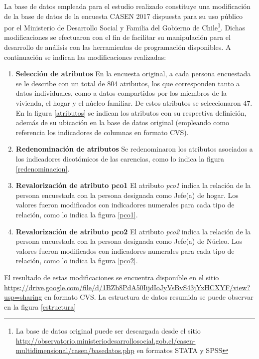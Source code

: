 \documentclass[12pt,letterpaper,spanish]{article}
\begin{document}
La base de datos empleada para el estudio realizado constituye una modificación de la base de datos de la encuesta CASEN 2017 dispuesta para su uso público por el Ministerio de Desarrollo Social y Familia del Gobierno de Chile\footnote{La base de datos original puede ser descargada desde el sitio \url{http://observatorio.ministeriodesarrollosocial.gob.cl/casen-multidimensional/casen/basedatos.php} en formatos STATA y SPSS}. Dichas modificaciones se efectuaron con el fin de facilitar su manipulación para el desarrollo de análisis con las herramientas de programación disponibles. A continuación se indican las modificaciones realizadas:

\begin{enumerate}
    \item \textbf{Selección de atributos}
    En la encuesta original, a cada persona encuestada se le describe con un total de 804 atributos, los que corresponden tanto a datos individuales, como a datos compartidos por los miembros de la vivienda, el hogar y el núcleo familiar. De estos atributos se seleccionaron 47. En la figura \ref{atributos} se indican los atributos con su respectiva definición, además de su ubicación en la base de datos original (empleando como referencia los indicadores de columnas en formato CVS). 
    
    \item \textbf{Redenominación de atributos}
    Se redenominaron los atributos asociados a los indicadores dicotómicos de las carencias, como lo indica la figura \ref{redenominacion}.
    
    \item \textbf{Revalorización de atributo pco1}
    El atributo \textit{pco1} indica la relación de la persona encuestada con la persona designada como Jefe(a) de hogar. Los valores fueron modificados con indicadores numerales para cada tipo de relación, como lo indica la figura \ref{pco1}.
    
    \item \textbf{Revalorización de atributo pco2}
    El atributo \textit{pco2} indica la relación de la persona encuestada con la persona designada como Jefe(a) de Núcleo. Los valores fueron modificados con indicadores numerales para cada tipo de relación, como lo indica la figura \ref{pco2}.
    
\end{enumerate}

El resultado de estas modificaciones se encuentra disponible en el sitio \url{https://drive.google.com/file/d/1BZb8PdA50IijdIoJyVsBvS43jYxHCXYF/view?usp=sharing} en formato CVS. La estructura de datos resumida se puede observar en la figura \ref{estructura}
\end{document}
